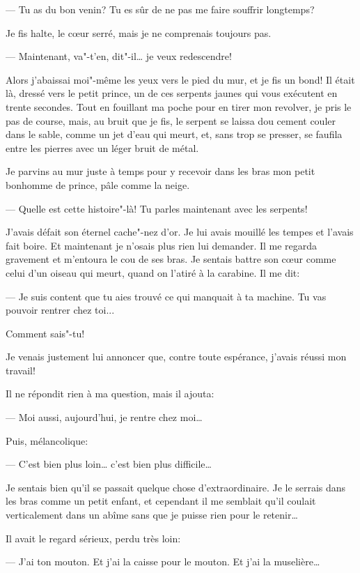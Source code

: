 --- Tu as du bon venin? Tu es sûr de ne pas me faire souffrir longtemps?

Je fis halte, le cœur serré, mais je ne comprenais toujours pas.

--- Maintenant, va"-t'en, dit"-il\ldots{} je veux redescendre!

Alors j'abaissai moi"-même les yeux vers le pied du mur, et je fis un bond!
Il était là, dressé vers le petit prince, un de ces serpents jaunes qui vous
exécutent en trente secondes. Tout en fouillant ma poche pour en tirer mon
revolver, je pris le pas de course, mais, au bruit que je fis, le serpent se
laissa dou cement couler dans le sable, comme un jet d'eau qui meurt, et,
sans trop se presser, se faufila entre les pierres avec un léger bruit de
métal.

Je parvins au mur juste à temps pour y recevoir dans les bras mon petit
bonhomme de prince, pâle comme la neige.

--- Quelle est cette histoire"-là! Tu parles maintenant avec les serpents!

J'avais défait son éternel cache"-nez d'or. Je lui avais mouillé les tempes
et l'avais fait boire. Et maintenant je n'osais plus rien lui demander. Il
me regarda gravement et m'entoura le cou de ses bras. Je sentais battre son
cœur comme celui d'un oiseau qui meurt, quand on l'atiré à la carabine. Il
me dit:

--- Je suis content que tu aies trouvé ce qui manquait à ta machine. Tu vas
pouvoir rentrer chez toi...

Comment sais"-tu!

Je venais justement lui annoncer que, contre toute espérance, j'avais réussi
mon travail!

Il ne répondit rien à ma question, mais il ajouta:

--- Moi aussi, aujourd'hui, je rentre chez moi\ldots{}

Puis, mélancolique:

--- C'est bien plus loin\ldots{} c'est bien plus difficile\ldots{}

Je sentais bien qu'il se passait quelque chose d'extraordinaire. Je le serrais
dans les bras comme un petit enfant, et cependant il me semblait qu'il coulait
verticalement dans un abîme sans que je puisse rien pour le retenir\ldots{}

Il avait le regard sérieux, perdu très loin:

--- J'ai ton mouton. Et j'ai la caisse pour le mouton. Et j'ai la muselière\ldots{}


